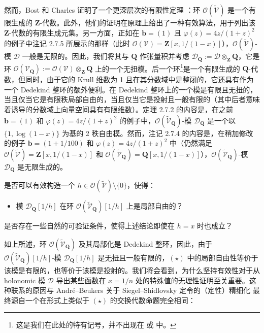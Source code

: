 然而，Bost 和 Charles 证明了一个更深层次的有限性定理 \cite[定理 9.1.1]{BC22}：环 \(\mathcal{O}(\widetilde{\mathcal{V}})\) 是一个有限生成的 \(\mathbf{Z}\)-代数。此外，他们的证明在原理上给出了一种有效算法，用于列出该 \(\mathbf{Z}\)-代数的有限生成元集。另一方面，正如在 \(\mathbf{b} = (1)\) 且 \(\varphi(z) = 4z/(1+z)^2\) 的例子中注记 2.7.5 所展示的那样（此时 \(\mathcal{O}(\mathcal{V}) = \mathbf{Z}[x,1/(1-x)]\)），\(\mathcal{O}(\widetilde{\mathcal{V}})\)-模 \(\mathcal{D}\) 一般是无限的。因此，我们将其与 \(\mathbf{Q}\) 作张量积并考虑 \(\mathcal{D}_{\mathbf{Q}} := \mathcal{D} \otimes_{\mathbf{Z}} \mathbf{Q}\)，它是环 \(\mathcal{O}(\mathcal{V}_{\mathbf{Q}}) := \mathcal{O}(\mathcal{V}) \otimes_{\mathbf{Z}} \mathbf{Q}\) 上的一个无扭模。后一个环\footnote{这是我们在此处的特有记号，并不出现在 \cite{Bos20} 或 \cite{BC22} 中。}是一个有限生成的 \(\mathbf{Q}\)-代数，但同时，由于它的 Krull 维数为 1 且在其分数域中是整闭的，它还具有作为一个 Dedekind 整环的额外便利。在 Dedekind 整环上的一个模是有限且无扭的，当且仅当它是有限秩局部自由的，当且仅当它是投射且一般有限的（其中后者意味着诱导的分数域上向量空间具有有限维数）。定理 2.7.2 的内容是，在之前 \(\mathbf{b} = (1)\) 和 \(\varphi(z) = 4z/(1+z)^2\) 的例子中，\(\mathcal{O}(\widetilde{\mathcal{V}}_{\mathbf{Q}})\)-模 \(\mathcal{D}_{\mathbf{Q}}\) 是一个以 \(\{1, \log(1-x)\}\) 为基的 2 秩自由模。然而，注记 2.7.4 的内容是，在稍加修改的例子 \(\mathbf{b} = (1 + 1/100)\) 和 \(\varphi(z) = 4z/(1+z)^2\) 中（仍然满足 \(\mathcal{O}(\widetilde{\mathcal{V}}) = \mathbf{Z}[x, 1/(1-x)]\) 和 \(\mathcal{O}(\widetilde{\mathcal{V}}_{\mathbf{Q}}) = \mathbf{Q}[x, 1/(1-x)]\)），\(\mathcal{O}(\widetilde{\mathcal{V}}_{\mathbf{Q}})\)-模 \(\mathcal{D}_{\mathbf{Q}}\) 是无限生成的。

\begin{question}\label{qu:15.2.2}
是否可以有效构造一个 \(h \in \mathcal{O}(\widetilde{\mathcal{V}}) \setminus \{0\}\)，使得：
\begin{itemize}
  \item[(\(*\))] 模 \(\mathcal{D}_{\mathbf{Q}}[1/h]\) 在环 \(\mathcal{O}(\widetilde{\mathcal{V}}_{\mathbf{Q}})[1/h]\) 上是局部自由的？
\end{itemize}
是否存在一些自然的可验证条件，使得上述结论即使在 \(h = x\) 时也成立？
\end{question}

如上所述，环 \(\mathcal{O}(\widetilde{\mathcal{V}}_{\mathbf{Q}})\) 及其局部化是 Dedekind 整环，因此，由于 \(\mathcal{O}(\widetilde{\mathcal{V}}_{\mathbf{Q}})[1/h]\)-模 \(\mathcal{D}_{\mathbf{Q}}[1/h]\) 是无扭且一般有限的，\((\star)\) 中的局部自由性等价于该模是有限的，也等价于该模是投射的。我们将会看到，为什么坚持有效性对于从 holonomic 模 \(\mathcal{D}\) 导出某些函数在 \(x=1/n\) 处的特殊值的无理性证明至关重要。这种联系的原因与 Andr{\'e}--Beukers 关于 Siegel--Shidlovsky 定令的（定性）精细化 \cite{And00a, And00b, Beu06} 最终源自一个在形式上类似于 \((\star)\) 的交换代数命题完全相同：

